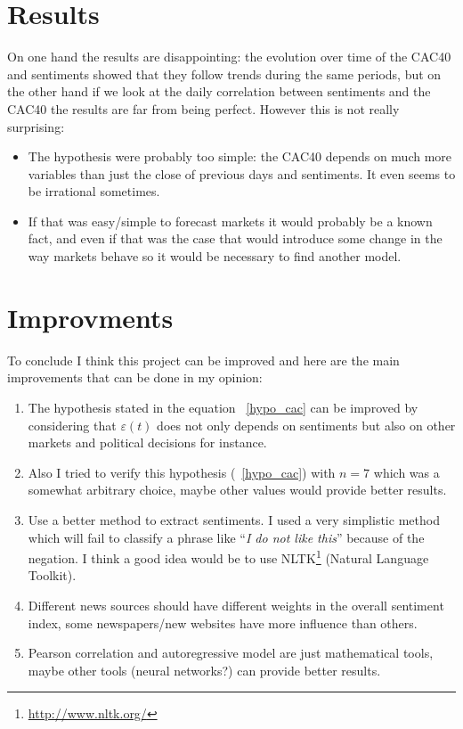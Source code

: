\documentclass[12pt]{report}
\begin{document}
\section{Results}
On one hand the results are disappointing: the evolution over time of the CAC40 and sentiments showed that they follow trends during the same periods, but on the other hand if we look at the daily correlation between sentiments and the CAC40 the results are far from being perfect. However this is not really surprising:
\begin{itemize}
	\item The hypothesis were probably too simple: the CAC40 depends on much more variables than just the close of previous days and sentiments. It even seems to be irrational sometimes.
	\item If that was easy/simple to forecast markets it would probably be a known fact, and even if that was the case that would introduce some change in the way markets behave so it would be necessary to find another model.
\end{itemize}

\section{Improvments}
To conclude I think this project can be improved and here are the main improvements that can be done in my opinion:
\begin{enumerate}
	\item The hypothesis stated in the equation ~\ref{hypo_cac} can be improved by considering that $\varepsilon(t)$ does not only depends on sentiments but also on other markets and political decisions for instance.
	\item Also I tried to verify this hypothesis (~\ref{hypo_cac}) with $n = 7$ which was a somewhat arbitrary choice, maybe other values would provide better results.
	\item Use a better method to extract sentiments. I used a very simplistic method which will fail to classify a phrase like ``\emph{I do not like this}'' because of the negation. I think a good idea would be to use NLTK\footnote{\url{http://www.nltk.org/}} (Natural Language Toolkit).
	\item Different news sources should have different weights in the overall sentiment index, some newspapers/new websites have more influence than others.
	\item Pearson correlation and autoregressive model are just mathematical tools, maybe other tools (neural networks?) can provide better results.
\end{enumerate}



\end{document}

